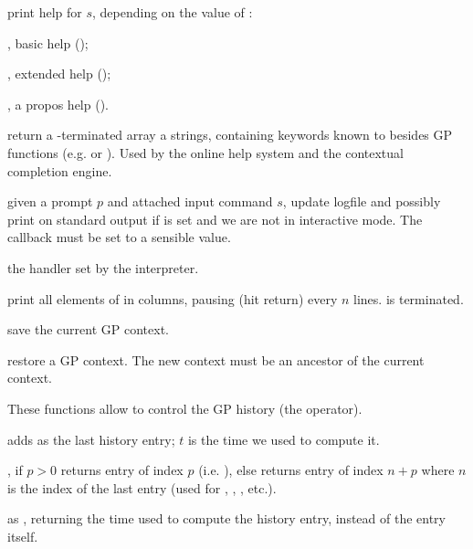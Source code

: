  print help for $s$, depending
on the value of \fl:

\item {}, basic help ();

\item {}, extended help ();

\item {}, a propos help ().

 return a
-terminated array a strings, containing keywords known to
 besides GP functions (e.g.  or ).
Used by the online help system and the contextual completion engine.

 given a prompt
$p$ and attached input command $s$, update logfile and possibly
print on standard output if  is set and we are not in interactive
mode. The callback  must be set to a sensible
value.

 the  handler
set by the  interpreter.

print all elements of  in columns, pausing (hit return)
every $n$ lines.  is  terminated.


 save the current GP
context.

 restore a GP context.
The new context must be an ancestor of the current context.


These functions allow to control the GP history (the \kbd{\%} operator).

 adds  as the last history
entry; $t$ is the time we used to compute it.

, if $p>0$ returns entry of index $p$
(i.e. ), else returns entry of index $n+p$ where $n$ is the
index of the last entry (used for \kbd{\%}, , , etc.).

 as ,
returning the time used to compute the history entry, instead of the entry
itself.

